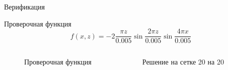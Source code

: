 \documentclass[ignoreonframetext,unicode]{beamer}
\begin{document}
\begin{frame}{Верификация}
	\vspace*{-1mm}
	\begin{block}{Проверочная функция}
		\begin{equation*}
			f(x, z) = -2 \frac{\pi z}{0.005} \sin{\frac{2 \pi z}{0.005}} \sin{\frac{4 \pi x}{0.005}}
			\label{check_func_2}
		\end{equation*}
	\end{block}
	
	\vspace*{-6mm}
	\begin{columns}
		
		
		\begin{figure}[!htbp]
			\caption{Проверочная функция}
			\label{check_func_2_pic}
		\end{figure}
		
		\begin{figure}[!htbp]
			\caption{Решение на сетке 20 на 20}
			\label{res_check_func_2}
		\end{figure}
		
	\end{columns}
\end{frame}
\end{document}
